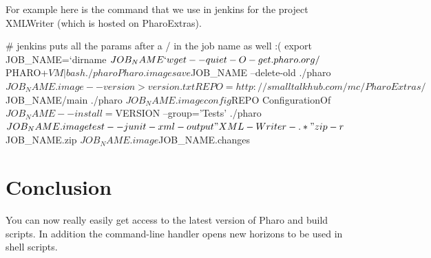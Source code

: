 \documentclass[a4paper,10pt,twoside]{book}
\begin{document}
For example here is the command that we use in jenkins for the project XMLWriter (which is hosted on PharoExtras). 

\begin{code}{}
# jenkins puts all the params after a / in the job name as well :(
export JOB_NAME=`dirname $JOB_NAME`

wget --quiet -O - get.pharo.org/$PHARO+$VM | bash

./pharo Pharo.image save $JOB_NAME --delete-old
./pharo $JOB_NAME.image --version > version.txt

REPO=http://smalltalkhub.com/mc/PharoExtras/$JOB_NAME/main
./pharo $JOB_NAME.image config $REPO ConfigurationOf$JOB_NAME --install=$VERSION --group='Tests'
./pharo $JOB_NAME.image test --junit-xml-output "XML-Writer-.*"

zip -r $JOB_NAME.zip $JOB_NAME.image $JOB_NAME.changes
\end{code}

\section{Conclusion}
You can now really easily get access to the latest version of Pharo and build scripts. In addition the 
command-line handler opens new horizons to be used in shell scripts.

\ifx\wholebook\relax\else
   
   
\end{document}
